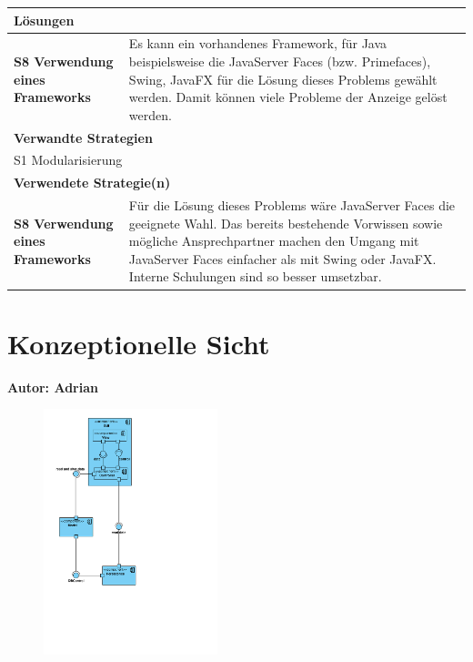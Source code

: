 \documentclass[fontsize=12pt,paper=a4,twoside]{scrartcl}
\begin{document}
 \begin{tabularx}{\textwidth}{|p{6cm}|X|}
 \hline
 \multicolumn{2}{|l|}{\textbf{Lösungen}} \\\hline
\textbf{S8 Verwendung eines Frameworks} & Es kann ein vorhandenes Framework, für Java beispielsweise die JavaServer Faces (bzw. Primefaces), Swing, JavaFX für die Lösung dieses Problems gewählt werden. Damit können viele Probleme der Anzeige gelöst werden.\\\hline
 \multicolumn{2}{|l|}{\textbf{Verwandte Strategien}} \\\hline
  \multicolumn{2}{|l|}{S1 Modularisierung} \\\hline
\multicolumn{2}{|l|}{\textbf{Verwendete Strategie(n)}} \\\hline
\textbf{S8 Verwendung eines Frameworks} & Für die Lösung dieses Problems wäre JavaServer Faces die geeignete Wahl. Das bereits bestehende Vorwissen sowie mögliche Ansprechpartner machen den Umgang mit JavaServer Faces einfacher als mit Swing oder JavaFX. Interne Schulungen sind so besser umsetzbar. \\\hline
\end{tabularx}

\newpage


\section{Konzeptionelle Sicht}
\label{sec:konzeptionell}
\textbf{Autor: Adrian}\\
\begin{figure}[H]
\centering
\includegraphics[width=0.45\textwidth]{konzeptsicht.pdf}
\end{figure}
\end{document}
